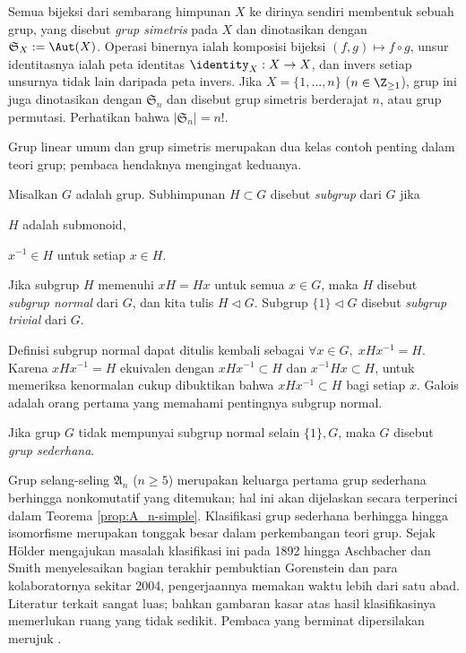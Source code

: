 \begin{example}\label{eg:symmetric-group}
	Semua bijeksi dari sembarang himpunan $X$ ke dirinya sendiri membentuk sebuah grup, yang disebut \emph{grup simetris} pada $X$ dan dinotasikan dengan $\mathfrak{S}_X:=\Aut(X)$. Operasi binernya ialah komposisi bijeksi $(f,g)\mapsto f\circ g$, unsur identitasnya ialah peta identitas $\identity_X:X\to X$, dan invers setiap unsurnya tidak lain daripada peta invers. Jika $X=\{1,\ldots,n\}$ ($n\in\Z_{\geq 1}$), grup ini juga dinotasikan dengan $\mathfrak{S}_n$ dan disebut grup simetris berderajat $n$, atau grup permutasi. Perhatikan bahwa $|\mathfrak{S}_n|=n!$.
\end{example}
Grup linear umum dan grup simetris merupakan dua kelas contoh penting dalam teori grup; pembaca hendaknya mengingat keduanya.

\begin{definition}
	Misalkan $G$ adalah grup. Subhimpunan $H \subset G$ disebut \emph{subgrup} dari $G$ jika
	\begin{inparaenum}[(i)]
		\item $H$ adalah submonoid,
		\item $x^{-1}\in H$ untuk setiap $x\in H$.
	\end{inparaenum}
	Jika subgrup $H$ memenuhi $xH=Hx$ untuk semua $x\in G$, maka $H$ disebut \emph{subgrup normal} dari $G$, dan kita tulis $H\lhd G$. Subgrup $\{1\}\lhd G$ disebut \emph{subgrup trivial} dari $G$.
\end{definition}
Definisi subgrup normal dapat ditulis kembali sebagai $\forall x\in G,\;xHx^{-1}=H$. Karena $xHx^{-1}=H$ ekuivalen dengan $xHx^{-1}\subset H$ dan $x^{-1}Hx\subset H$, untuk memeriksa kenormalan cukup dibuktikan bahwa $xHx^{-1}\subset H$ bagi setiap $x$. Galois adalah orang pertama yang memahami pentingnya subgrup normal.

\begin{definition}
	Jika grup $G$ tidak mempunyai subgrup normal selain $\{1\},G$, maka $G$ disebut \emph{grup sederhana}.
\end{definition}
Grup selang-seling $\mathfrak{A}_n$ ($n\geq 5$) merupakan keluarga pertama grup sederhana berhingga nonkomutatif yang ditemukan; hal ini akan dijelaskan secara terperinci dalam Teorema \ref{prop:A_n-simple}. Klasifikasi grup sederhana berhingga hingga isomorfisme merupakan tonggak besar dalam perkembangan teori grup. Sejak Hölder mengajukan masalah klasifikasi ini pada 1892 hingga Aschbacher dan Smith menyelesaikan bagian terakhir pembuktian Gorenstein dan para kolaboratornya sekitar 2004, pengerjaannya memakan waktu lebih dari satu abad. Literatur terkait sangat luas; bahkan gambaran kasar atas hasil klasifikasinya memerlukan ruang yang tidak sedikit. Pembaca yang berminat dipersilakan merujuk \cite{Wil09}.

